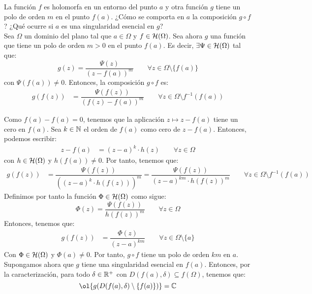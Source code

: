 \begin{ejercicio}
    La función $f$ es holomorfa en un entorno del punto $a$ y otra función $g$ tiene un polo de orden $m$ en el punto $f(a)$. ¿Cómo se comporta en $a$ la composición $g \circ f$? ¿Qué ocurre si $a$ es una singularidad esencial en $g$?\\

    Sea $\Omega$ un dominio del plano tal que $a\in \Omega$ y $f \in \mathcal{H}(\Omega)$. Sea ahora $g$ una función que tiene un polo de orden $m > 0$ en el punto $f(a)$. Es decir, $\exists \Psi \in \mathcal{H}(\Omega)$ tal que:
    \begin{equation*}
        g(z) = \dfrac{\Psi(z)}{(z - f(a))^m}\qquad \forall z \in \Omega \setminus \{f(a)\}
    \end{equation*}
    con $\Psi(f(a)) \neq 0$. Entonces, la composición $g \circ f$ es:
    \begin{align*}
        g(f(z)) &= \dfrac{\Psi(f(z))}{(f(z) - f(a))^m}\qquad \forall z \in \Omega \setminus f^{-1}(f(a))
    \end{align*}

    Como $f(a)-f(a) = 0$, tenemos que la aplicación $z\mapsto z - f(a)$ tiene un cero en $f(a)$. Sea $k \in \mathbb{N}$ el orden de $f(a)$ como cero de $z - f(a)$. Entonces, podemos escribir:
    \begin{align*}
        z - f(a) &= (z - a)^k \cdot h(z)\qquad \forall z \in \Omega
    \end{align*}
    con $h \in \mathcal{H}(\Omega)$ y $h(f(a)) \neq 0$. Por tanto, tenemos que:
    \begin{align*}
        g(f(z)) &= \dfrac{\Psi(f(z))}{\left((z - a)^k \cdot h(f(z))\right)^m}
        = \dfrac{\Psi(f(z))}{(z - a)^{km} \cdot h(f(z))^m}\qquad \forall z \in \Omega \setminus f^{-1}(f(a))
    \end{align*}
    Definimos por tanto la función $\Phi \in \mathcal{H}(\Omega)$ como sigue:
    \begin{equation*}
        \Phi(z) = \dfrac{\Psi(f(z))}{h(f(z))^m}\qquad \forall z \in \Omega
    \end{equation*}
    Entonces, tenemos que:
    \begin{align*}
        g(f(z)) &= \dfrac{\Phi(z)}{(z - a)^{km}}\qquad \forall z \in \Omega \setminus \{a\}
    \end{align*}
    Con $\Phi \in \mathcal{H}(\Omega)$ y $\Phi(a) \neq 0$. Por tanto, $g \circ f$ tiene un polo de orden $km$ en $a$.\\

    Supongamos ahora que $g$ tiene una singularidad esencial en $f(a)$. Entonces, por la caracterización, para todo $\delta\in \mathbb{R}^+$ con $D(f(a), \delta) \subseteq f(\Omega)$, tenemos que:
    \begin{equation*}
        \ol{g(D(f(a), \delta)\setminus \{f(a)\})} = \bb{C}
    \end{equation*}


\end{ejercicio}
